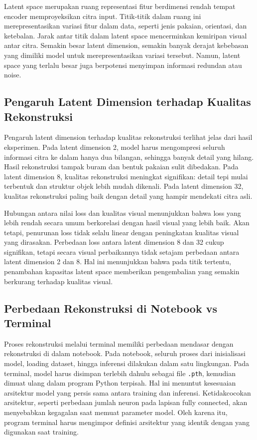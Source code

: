 \documentclass[12pt,a4paper]{article}
\begin{document}
Latent space merupakan ruang representasi fitur berdimensi rendah tempat encoder memproyeksikan citra input. Titik-titik dalam ruang ini merepresentasikan variasi fitur dalam data, seperti jenis pakaian, orientasi, dan ketebalan. Jarak antar titik dalam latent space mencerminkan kemiripan visual antar citra. Semakin besar latent dimension, semakin banyak derajat kebebasan yang dimiliki model untuk merepresentasikan variasi tersebut. Namun, latent space yang terlalu besar juga berpotensi menyimpan informasi redundan atau noise.

\subsection{Pengaruh Latent Dimension terhadap Kualitas Rekonstruksi}

Pengaruh latent dimension terhadap kualitas rekonstruksi terlihat jelas dari hasil eksperimen. Pada latent dimension 2, model harus mengompresi seluruh informasi citra ke dalam hanya dua bilangan, sehingga banyak detail yang hilang. Hasil rekonstruksi tampak buram dan bentuk pakaian sulit dibedakan. Pada latent dimension 8, kualitas rekonstruksi meningkat signifikan: detail tepi mulai terbentuk dan struktur objek lebih mudah dikenali. Pada latent dimension 32, kualitas rekonstruksi paling baik dengan detail yang hampir mendekati citra asli.

Hubungan antara nilai loss dan kualitas visual menunjukkan bahwa loss yang lebih rendah secara umum berkorelasi dengan hasil visual yang lebih baik. Akan tetapi, penurunan loss tidak selalu linear dengan peningkatan kualitas visual yang dirasakan. Perbedaan loss antara latent dimension 8 dan 32 cukup signifikan, tetapi secara visual perbaikannya tidak setajam perbedaan antara latent dimension 2 dan 8. Hal ini menunjukkan bahwa pada titik tertentu, penambahan kapasitas latent space memberikan pengembalian yang semakin berkurang terhadap kualitas visual.

\subsection{Perbedaan Rekonstruksi di Notebook vs Terminal}

Proses rekonstruksi melalui terminal memiliki perbedaan mendasar dengan rekonstruksi di dalam notebook. Pada notebook, seluruh proses dari inisialisasi model, loading dataset, hingga inferensi dilakukan dalam satu lingkungan. Pada terminal, model harus disimpan terlebih dahulu sebagai file \texttt{.pth}, kemudian dimuat ulang dalam program Python terpisah. Hal ini menuntut kesesuaian arsitektur model yang persis sama antara training dan inferensi. Ketidakcocokan arsitektur, seperti perbedaan jumlah neuron pada lapisan fully connected, akan menyebabkan kegagalan saat memuat parameter model. Oleh karena itu, program terminal harus mengimpor definisi arsitektur yang identik dengan yang digunakan saat training.
\end{document}

